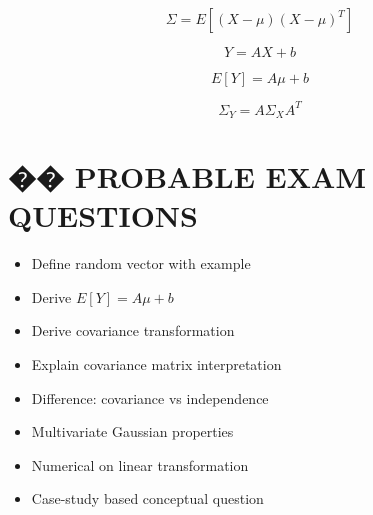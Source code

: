 \documentclass[12pt]{article}
\begin{document}
\[
\Sigma = E[(X - \mu)(X - \mu)^T]
\]

\[
Y = AX + b
\]

\[
E[Y] = A\mu + b
\]

\[
\Sigma_Y = A \Sigma_X A^T
\]

\section*{�� PROBABLE EXAM QUESTIONS}

\begin{itemize}
\item Define random vector with example
\item Derive $E[Y] = A\mu + b$
\item Derive covariance transformation
\item Explain covariance matrix interpretation
\item Difference: covariance vs independence
\item Multivariate Gaussian properties
\item Numerical on linear transformation
\item Case-study based conceptual question
\end{itemize}
\end{document}
